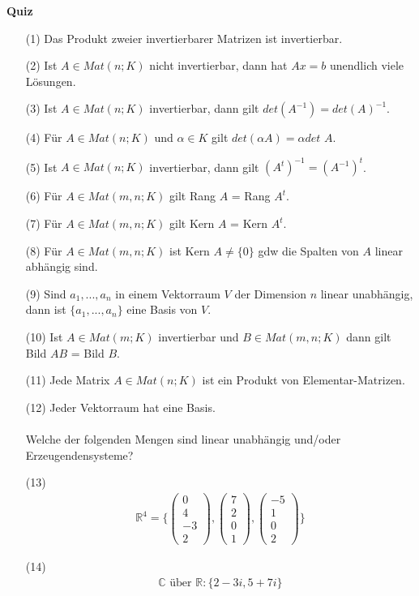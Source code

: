 \documentclass[11pt]{report}
\newcommand*\Zb[1] {\mathbb{#1}}
\newcommand*\f[1] {\textbf{#1}}
\begin{document}
\newpage
\Large \f{Quiz} \normalsize \\
\begin{itemize}
\item[(1)] Das Produkt zweier invertierbarer Matrizen ist invertierbar.
\item[(2)] Ist $A \in Mat(n;K)$ nicht invertierbar, dann hat $Ax = b$ unendlich viele Lösungen.
\item[(3)] Ist $A \in Mat(n;K)$ invertierbar, dann gilt $det(A^{-1}) = det(A)^{-1}$.
\item[(4)] Für $A \in Mat(n;K)$ und $\alpha \in K$ gilt $det(\alpha A) = \alpha det$ $A$.
\item[(5)] Ist $A \in Mat(n;K)$ invertierbar, dann gilt $(A^t)^{-1} = (A^{-1})^t$.
\item[(6)] Für $A \in Mat(m,n;K)$ gilt Rang $A$ = Rang $A^t$.
\item[(7)] Für $A \in Mat(m,n;K)$ gilt Kern $A$ = Kern $A^t$.
\item[(8)] Für $A \in Mat(m,n;K)$ ist Kern $A \neq \{0\}$ gdw die Spalten von $A$ linear abhängig sind.
\item[(9)] Sind $a_1, ..., a_n$ in einem Vektorraum $V$ der Dimension $n$ linear unabhängig, dann ist $\{a_1, ..., a_n\}$ eine Basis von $V$.
\item[(10)] Ist $A \in Mat(m;K)$ invertierbar und $B \in Mat(m,n;K)$ dann gilt Bild $AB$ = Bild $B$.
\item[(11)] Jede Matrix $A \in Mat(n;K)$ ist ein Produkt von Elementar-Matrizen.
\item[(12)] Jeder Vektorraum hat eine Basis. \\\\
Welche der folgenden Mengen sind linear unabhängig und/oder Erzeugendensysteme?
\item[(13)] 
\begin{align}
\Zb{R}^4 = \{\begin{pmatrix} 0 \\ 4 \\ -3 \\ 2 \end{pmatrix}, \begin{pmatrix} 7 \\ 2 \\ 0 \\ 1 \end{pmatrix}, \begin{pmatrix} -5 \\ 1 \\ 0 \\ 2 \end{pmatrix}\}
\end{align}
\item[(14)] 
\begin{align}
\Zb{C} \text{ über } \Zb{R}: \{2-3i, 5 + 7i\}
\end{align}


\end{itemize}
\end{document}
